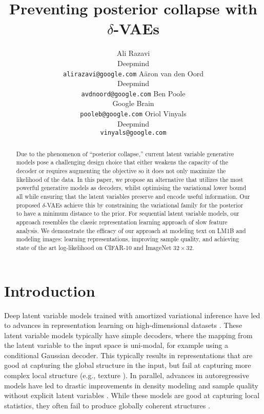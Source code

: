 \documentclass{article} \usepackage{iclr2019_conference,times}
\title{Preventing posterior collapse with $\delta$-VAEs}
\author{Ali Razavi \\
  Deepmind \\
  \texttt{alirazavi@google.com}
  \And
  A\"aron van den Oord \\
  Deepmind \\
  \texttt{avdnoord@google.com}
  \And
  Ben Poole \\
  Google Brain \\
  \texttt{pooleb@google.com}
  \And
  Oriol Vinyals \\
  Deepmind \\
  \texttt{vinyals@google.com}
}
\begin{document}
\maketitle

\begin{abstract}
Due to the phenomenon of ``posterior collapse,'' current latent variable generative models pose a challenging design choice that either weakens the capacity of the decoder or requires augmenting the objective so it does not only maximize the likelihood of the data.
In this paper, we propose an alternative that utilizes the most powerful generative models as decoders, whilst optimising the variational lower bound all while ensuring that the latent variables preserve and encode useful information.
Our proposed $\delta$-VAEs achieve this by constraining the variational family for the posterior to have a minimum distance to the prior.
For sequential latent variable models, our approach resembles the classic representation learning approach of slow feature analysis. We demonstrate the efficacy of our approach at modeling text on LM1B and modeling images: learning representations, improving sample quality, and achieving state of the art log-likelihood on CIFAR-10 and ImageNet $32\times 32$.


\end{abstract}

\section{Introduction}
Deep latent variable models trained with amortized variational inference have led to advances in representation learning on high-dimensional datasets \citep{VAE, Rezende2014}. These latent variable models typically have simple decoders, where the mapping from the latent variable to the input space is uni-modal, for example using a conditional Gaussian decoder. This typically results in representations that are good at capturing the global structure in the input, but fail at capturing more complex local structure (e.g., texture \citep{vaegan}). In parallel, advances in autoregressive models have led to drastic improvements in density modeling and sample quality without explicit latent variables \citep{pixelcnn}. While these models are good at capturing local statistics, they often fail to produce globally coherent structures \citep{pixeliqn}.
\end{document}
